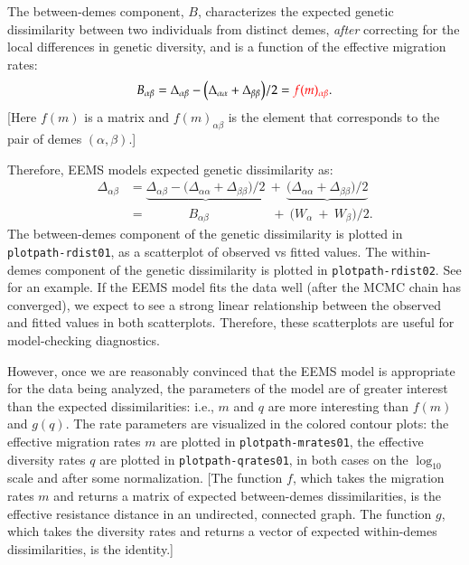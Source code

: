 \documentclass[a4paper,10pt,DIV=15,titlepage,mpinclude=true]{scrartcl}
\newcommand{\keystring}[1]{{\tt #1}}
\begin{document}
The between-demes component, $B$, characterizes the expected genetic dissimilarity between two individuals from distinct demes, \textit{after} correcting for the local differences in genetic diversity, and is a function of the effective migration rates: 
\begin{align}
B_{\alpha\beta} = \Delta_{\alpha\beta} - \big(\Delta_{\alpha\alpha}+\Delta_{\beta\beta}\big)/2 = {\color{red} f(m)_{\alpha\beta}}.
\end{align}
[Here $f(m)$ is a matrix and $f(m)_{\alpha\beta}$ is the element that corresponds to the pair of demes $(\alpha,\beta)$.]

Therefore, EEMS models expected genetic dissimilarity as:
\begin{align}
\Delta_{\alpha\beta} & = \underbrace{\Delta_{\alpha\beta} - \big(\Delta_{\alpha\alpha}+\Delta_{\beta\beta}\big)/2} ~+~ \underbrace{\big(\Delta_{\alpha\alpha}+\Delta_{\beta\beta}\big)/2}\\
&= \phantom{\Delta_{\alpha\beta} -\big(}B_{\alpha\beta}\phantom{\big(+\Delta_{\beta\beta}\big)/2} ~+~ \big(W_\alpha ~+~ W_\beta\big)/2.
\end{align}
The between-demes component of the genetic dissimilarity is plotted in \keystring{plotpath-rdist01}, as a scatterplot of observed vs fitted values. The within-demes component of the genetic dissimilarity is plotted in \keystring{plotpath-rdist02}. See  for an example. If the EEMS model fits the data well (after the MCMC chain has converged), we expect to see a strong linear relationship between the observed and fitted values in both scatterplots. Therefore, these scatterplots are useful for model-checking diagnostics.

However, once we are reasonably convinced that the EEMS model is appropriate for the data being analyzed, the parameters of the model are of greater interest than the expected dissimilarities: i.e., $m$ and $q$ are more interesting than $f(m)$ and $g(q)$. The rate parameters are visualized in the colored contour plots: the effective migration rates $m$ are plotted in \keystring{plotpath-mrates01}, the effective diversity rates $q$ are plotted in \keystring{plotpath-qrates01}, in both cases on the $\log_{10}$ scale and after some normalization. [The function $f$, which takes the migration rates $m$ and returns a matrix of expected between-demes dissimilarities, is the effective resistance distance in an undirected, connected graph. The function $g$, which takes the diversity rates and returns a vector of expected within-demes dissimilarities, is the identity.]
\end{document}

